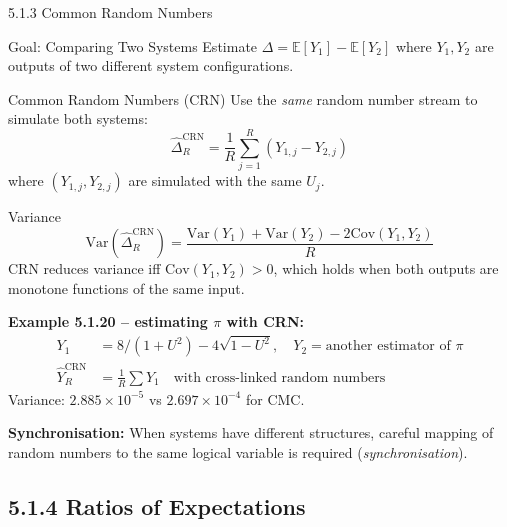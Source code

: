 \documentclass[aspectratio=169,10pt]{beamer}
\begin{document}
\begin{frame}[allowframebreaks]{5.1.3 Common Random Numbers}

  \begin{block}{Goal: Comparing Two Systems}
    Estimate $\Delta = \mathbb{E}[Y_1] - \mathbb{E}[Y_2]$ where $Y_1, Y_2$ are
    outputs of two different system configurations.
  \end{block}

  \begin{block}{Common Random Numbers (CRN)}
    Use the \emph{same} random number stream to simulate both systems:
    \[
      \hat{\Delta}_R^{\mathrm{CRN}} = \frac{1}{R}\sum_{j=1}^R (Y_{1,j} - Y_{2,j})
    \]
    where $(Y_{1,j}, Y_{2,j})$ are simulated with the same $U_j$.
  \end{block}

  \begin{block}{Variance}
    \[
      \mathrm{Var}(\hat{\Delta}_R^{\mathrm{CRN}}) = \frac{\mathrm{Var}(Y_1) +
      \mathrm{Var}(Y_2) - 2\mathrm{Cov}(Y_1, Y_2)}{R}
    \]
    CRN reduces variance iff $\mathrm{Cov}(Y_1, Y_2) > 0$, which holds when
    both outputs are monotone functions of the same input.
  \end{block}

  \framebreak

  \textbf{Example 5.1.20 -- estimating $\pi$ with CRN:}
  \begin{align*}
    Y_1 &= 8/(1+U^2) - 4\sqrt{1-U^2}, \quad Y_2 = \text{another estimator of } \pi\\
    \hat{Y}_R^{\mathrm{CRN}} &= \frac{1}{R}\sum Y_1 \quad\text{with cross-linked random numbers}
  \end{align*}
  Variance: $2.885 \times 10^{-5}$ vs $2.697 \times 10^{-4}$ for CMC.

  \medskip
  \textbf{Synchronisation:} When systems have different structures, careful
  mapping of random numbers to the same logical variable is required
  (\emph{synchronisation}).

\end{frame}

\subsection{5.1.4 Ratios of Expectations}
\end{document}
